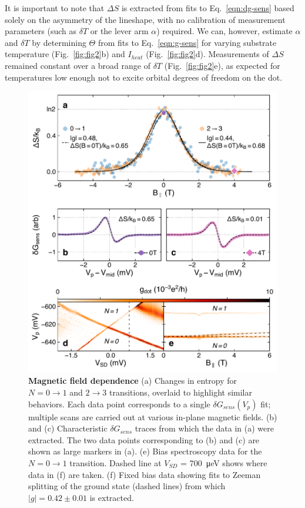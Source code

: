 \documentclass[twocolumn,showpacs,amsmath,amssymb,prl,aps,superscriptaddress]{revtex4-1}
\begin{document}
It is important to note that $\Delta S$ is extracted from fits to Eq.~\ref{eqn:dg-sens} based solely on the asymmetry of the lineshape, with no calibration of measurement parameters (such as $\delta T$ or the lever arm $\alpha$) required.  We can, however, estimate $\alpha$ and $\delta T$ by determining $\Theta$ from fits to Eq.~\ref{eqn:g-sens} for varying substrate temperature (Fig.~\ref{fig:fig2}b) and $I_{heat}$ (Fig.~\ref{fig:fig2}d). Measurements of $\Delta S$ remained constant over a broad range of $\delta T$ (Fig.~\ref{fig:fig2}e), as expected for temperatures low enough not to excite orbital degrees of freedom on the dot. 

\begin{figure}
        \includegraphics[width=1.0\columnwidth]{../figures/figure_3.pdf}
        \caption{\label{fig:fig3} \textbf{Magnetic field dependence} (a) Changes in entropy for $N=0 \rightarrow 1$ and $2 \rightarrow 3$ transitions, overlaid to highlight similar behaviors.  Each data point corresponds to a single $\delta G_{sens}(V_p)$ fit; multiple scans are carried out at various in-plane magnetic fields.   (b) and (c) Characteristic $\delta G_{sens}$ traces from which the data in (a) were extracted. The two data points corresponding to (b) and (c) are shown as large markers in (a). (e) Bias spectroscopy data for the $N=0 \rightarrow 1$ transition. Dashed line at $V_{SD}$ = \SI{700}{\micro\electronvolt} shows where data in (f) are taken. (f) Fixed bias data showing fits to Zeeman splitting of the ground state (dashed lines) from which $|g| = 0.42 \pm 0.01$ is extracted.}
\end{figure}
\end{document}
